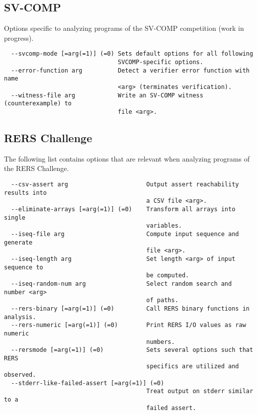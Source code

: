 \documentclass[natbib]{article}
\begin{document}
\subsection{SV-COMP}
Options specific to analyzing programs of the SV-COMP competition (work in progress).
\begin{verbatim}
  --svcomp-mode [=arg(=1)] (=0) Sets default options for all following 
                                SVCOMP-specific options.
  --error-function arg          Detect a verifier error function with name 
                                <arg> (terminates verification).
  --witness-file arg            Write an SV-COMP witness (counterexample) to 
                                file <arg>.
\end{verbatim}


\subsection{RERS Challenge}
The following list contains options that are relevant when analyzing programs of the RERS Challenge.
\begin{verbatim}
  --csv-assert arg                      Output assert reachability results into
                                        a CSV file <arg>.
  --eliminate-arrays [=arg(=1)] (=0)    Transform all arrays into single 
                                        variables.
  --iseq-file arg                       Compute input sequence and generate 
                                        file <arg>.
  --iseq-length arg                     Set length <arg> of input sequence to 
                                        be computed.
  --iseq-random-num arg                 Select random search and number <arg> 
                                        of paths.
  --rers-binary [=arg(=1)] (=0)         Call RERS binary functions in analysis.
  --rers-numeric [=arg(=1)] (=0)        Print RERS I/O values as raw numeric 
                                        numbers.
  --rersmode [=arg(=1)] (=0)            Sets several options such that RERS 
                                        specifics are utilized and observed.
  --stderr-like-failed-assert [=arg(=1)] (=0)
                                        Treat output on stderr similar to a 
                                        failed assert.
\end{verbatim}
\end{document}
